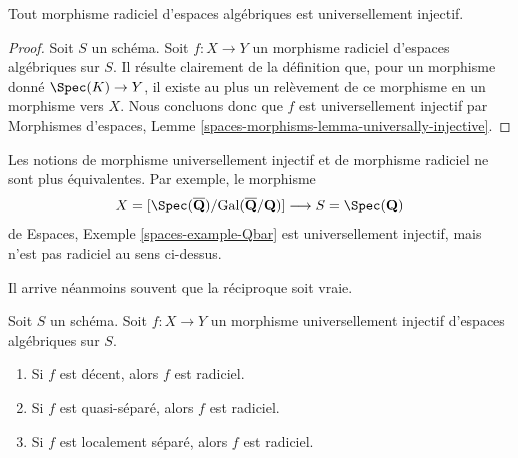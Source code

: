 \begin{lemma}
\label{lemma-radicial-implies-universally-injective}
Tout morphisme radiciel d'espaces algébriques est universellement injectif.
\end{lemma}

\begin{proof}
Soit $S$ un schéma. Soit $f : X \to Y$ un morphisme radiciel
d'espaces algébriques sur $S$.
Il résulte clairement de la définition que, pour un morphisme donné
$\Spec(K) \to Y$, il existe au plus un relèvement de ce morphisme
en un morphisme vers $X$. Nous concluons donc que $f$ est universellement
injectif par
Morphismes d'espaces,
Lemme \ref{spaces-morphisms-lemma-universally-injective}.
\end{proof}

\begin{example}
\label{example-universally-injective-not-radicial}
Les notions de morphisme universellement injectif et de morphisme radiciel ne sont plus équivalentes.
Par exemple, le morphisme
$$
X = [\Spec(\overline{\mathbf{Q}})/
\text{Gal}(\overline{\mathbf{Q}}/\mathbf{Q})]
\longrightarrow
S = \Spec(\mathbf{Q})
$$
de
Espaces, Exemple \ref{spaces-example-Qbar}
est universellement injectif, mais n'est pas radiciel au sens ci-dessus.
\end{example}

\noindent
Il arrive néanmoins souvent que la réciproque soit vraie.

\begin{lemma}
\label{lemma-when-universally-injective-radicial}
Soit $S$ un schéma. Soit $f : X \to Y$ un morphisme universellement injectif
d'espaces algébriques sur $S$.
\begin{enumerate}
\item Si $f$ est décent, alors $f$ est radiciel.
\item Si $f$ est quasi-séparé, alors $f$ est radiciel.
\item Si $f$ est localement séparé, alors $f$ est radiciel.
\end{enumerate}
\end{lemma}

